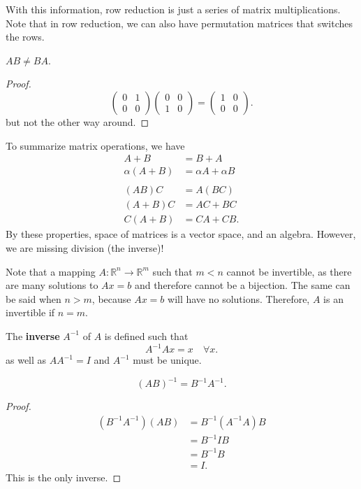 With this information, row reduction is just a series of matrix multiplications. Note that in row reduction, we can also have permutation matrices that switches the rows.

\begin{theorem}
	\( AB \neq  BA \).
\end{theorem}
\begin{proof}
	\[
		\begin{pmatrix}
			0 & 1 \\ 0 & 0
		\end{pmatrix} \begin{pmatrix}
			0 & 0 \\ 1 & 0
		\end{pmatrix} = \begin{pmatrix}
			1 & 0 \\ 0 & 0
		\end{pmatrix}
	.\] but not the other way around.
\end{proof}

To summarize matrix operations, we have 
\begin{align*}
	A + B &= B + A \\
	\alpha (A + B) &= \alpha A + \alpha B \\ \\
	(AB)C &=  A(BC) \\
	(A+B)C &= AC+BC \\
	C(A+B) &= CA + CB 
.\end{align*} By these properties, space of matrices is a vector space, and an algebra. However, we are missing division (the inverse)!

Note that a mapping \( A : \mathbb{R}^{n} \to \mathbb{R}^{m}   \) such that \( m<n \) cannot be invertible, as there are many solutions to \( Ax=b\) and therefore cannot be a bijection. The same can be said when \( n>m \), because \( Ax=b \) will have no solutions. Therefore, \( A \) is an invertible if \( n=m \).

\begin{definition}
	The \textbf{inverse} \( A^{-1}  \) of \( A \) is defined such that \[
		A^{-1} A x = x \quad \forall x
	.\] as well as \( A A^{-1}=I   \) and \( A^{-1}  \) must be unique.
\end{definition}

\begin{theorem}
	\[
		(AB)^{-1}  = B^{-1} A^{-1} 
	.\] 
\end{theorem}
\begin{proof}
	\begin{align*}
		(B^{-1}A^{-1}  )(AB) &= B^{-1}(A^{-1}A )B  \\
		&= B^{-1} I B  \\
		&= B^{-1} B  \\
		&= I
	.\end{align*}
	This is the only inverse.
\end{proof}

